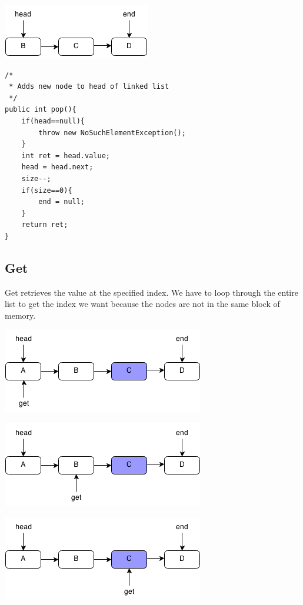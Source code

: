 \documentclass[11pt,oneside]{book}
\makeatletter
\def\maxwidth#1{\ifdim\Gin@nat@width>#1 #1\else\Gin@nat@width\fi}
\makeatother
\begin{document}
\vspace{5px}\includegraphics[width=\maxwidth{\textwidth}]{linkedlistpop2.png}

\begin{lstlisting}
/*
 * Adds new node to head of linked list
 */
public int pop(){
    if(head==null){
        throw new NoSuchElementException();
    }
    int ret = head.value;
    head = head.next;
    size--;
    if(size==0){
        end = null;
    }
    return ret;
}
\end{lstlisting}

\subsection{Get}

Get retrieves the value at the specified index. We have to loop through the entire list to get the index we want because the nodes are not in the same block of memory.

\vspace{5px}\includegraphics[width=\maxwidth{\textwidth}]{linkedlistget.png}

\vspace{5px}\includegraphics[width=\maxwidth{\textwidth}]{linkedlistget2.png}

\vspace{5px}\includegraphics[width=\maxwidth{\textwidth}]{linkedlistget3.png}
\end{document}

